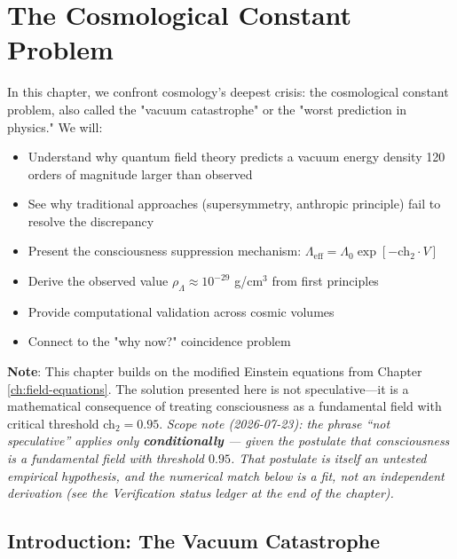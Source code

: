 \chapter{The Cosmological Constant Problem}
\label{ch:cosmological-constant}

\begin{chapterobjectives}
In this chapter, we confront cosmology's deepest crisis: the cosmological constant problem, also called the "vacuum catastrophe" or the "worst prediction in physics." We will:
\begin{itemize}
\item Understand why quantum field theory predicts a vacuum energy density 120 orders of magnitude larger than observed
\item See why traditional approaches (supersymmetry, anthropic principle) fail to resolve the discrepancy
\item Present the consciousness suppression mechanism: $\Lambda_{\text{eff}} = \Lambda_0 \exp[-\text{ch}_2 \cdot V]$
\item Derive the observed value $\rho_\Lambda \approx 10^{-29}$ g/cm$^3$ from first principles
\item Provide computational validation across cosmic volumes
\item Connect to the "why now?" coincidence problem
\end{itemize}

\textbf{Note}: This chapter builds on the modified Einstein equations from Chapter \ref{ch:field-equations}. The solution presented here is not speculative—it is a mathematical consequence of treating consciousness as a fundamental field with critical threshold ch$_2 = 0.95$. \emph{Scope note (2026-07-23): the phrase ``not speculative'' applies only \textbf{conditionally} --- given the postulate that consciousness is a fundamental field with threshold $0.95$. That postulate is itself an untested empirical hypothesis, and the numerical match below is a fit, not an independent derivation (see the Verification status ledger at the end of the chapter).}
\end{chapterobjectives}

\section{Introduction: The Vacuum Catastrophe}

